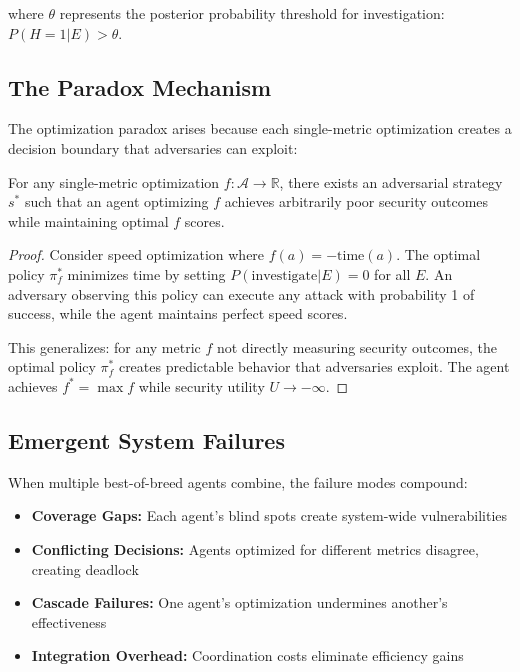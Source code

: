\documentclass[10pt,conference]{IEEEtran}
\begin{document}
where $\theta$ represents the posterior probability threshold for investigation: $P(H=1|E) > \theta$.

\subsection{The Paradox Mechanism}

The optimization paradox arises because each single-metric optimization creates a decision boundary that adversaries can exploit:

\begin{theorem}
For any single-metric optimization $f: \mathcal{A} \to \mathbb{R}$, there exists an adversarial strategy $s^*$ such that an agent optimizing $f$ achieves arbitrarily poor security outcomes while maintaining optimal $f$ scores.
\end{theorem}

\begin{proof}
Consider speed optimization where $f(a) = -\text{time}(a)$. The optimal policy $\pi^*_f$ minimizes time by setting $P(\text{investigate} | E) = 0$ for all $E$. An adversary observing this policy can execute any attack with probability 1 of success, while the agent maintains perfect speed scores.

This generalizes: for any metric $f$ not directly measuring security outcomes, the optimal policy $\pi^*_f$ creates predictable behavior that adversaries exploit. The agent achieves $f^* = \max f$ while security utility $U \to -\infty$.
\end{proof}

\subsection{Emergent System Failures}

When multiple best-of-breed agents combine, the failure modes compound:

\begin{itemize}
\item \textbf{Coverage Gaps:} Each agent's blind spots create system-wide vulnerabilities
\item \textbf{Conflicting Decisions:} Agents optimized for different metrics disagree, creating deadlock
\item \textbf{Cascade Failures:} One agent's optimization undermines another's effectiveness
\item \textbf{Integration Overhead:} Coordination costs eliminate efficiency gains
\end{itemize}
\end{document}
